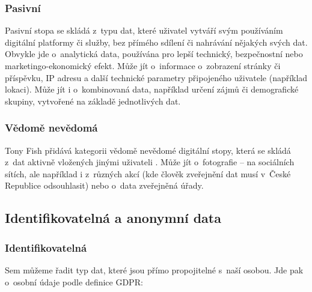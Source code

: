 \subsubsection*{Pasivní}

Pasivní stopa se skládá z~typu dat, které uživatel vytváří svým používáním digitální platformy či služby, bez přímého sdílení či nahrávání nějakých svých dat. Obvykle jde o~analytická data, používána pro lepší technický, bezpečnostní nebo marketingo-ekonomický efekt. Může jít o~informace o~zobrazení stránky či příspěvku, IP adresu a další technické parametry připojeného uživatele (například lokaci). Může jít i o~kombinovaná data, například určení zájmů či demografické skupiny, vytvořené na základě jednotlivých dat.

\subsubsection*{Vědomě nevědomá}

Tony Fish přidává kategorii vědomě nevědomé digitální stopy, která se skládá z~dat aktivně vložených jinými uživateli \citep{fish-digital-footprint}.
Může jít o~fotografie -- na sociálních sítích, ale například i z~různých akcí (kde člověk zveřejnění dat musí v~České Republice odsouhlasit) nebo o~data zveřejněná úřady.

\subsection{Identifikovatelná a anonymní data}

\subsubsection*{Identifikovatelná}

Sem můžeme řadit typ dat, které jsou přímo propojitelné s~naší osobou. Jde pak o~osobní údaje podle definice GDPR:

\begin{displayquote}
	\citep{gdpr}
\end{displayquote}

